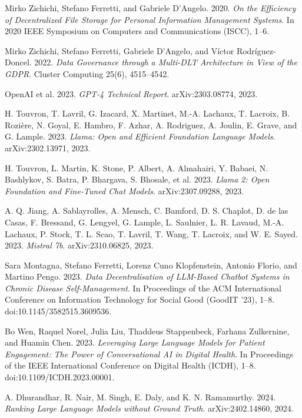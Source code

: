 \begin{thebibliography}{55}
Mirko Zichichi, Stefano Ferretti, and Gabriele D’Angelo. 2020. \emph{On the Efficiency of Decentralized File Storage for Personal Information Management Systems}. In 2020 IEEE Symposium on Computers and Communications (ISCC), 1--6.

Mirko Zichichi, Stefano Ferretti, Gabriele D’Angelo, and Víctor Rodríguez-Doncel. 2022. \emph{Data Governance through a Multi-DLT Architecture in View of the GDPR}. Cluster Computing 25(6), 4515--4542.

OpenAI et al. 2023. \emph{GPT-4 Technical Report}. arXiv:2303.08774, 2023.

H. Touvron, T. Lavril, G. Izacard, X. Martinet, M.-A. Lachaux, T. Lacroix, B. Rozière, N. Goyal, E. Hambro, F. Azhar, A. Rodriguez, A. Joulin, E. Grave, and G. Lample. 2023. \emph{Llama: Open and Efficient Foundation Language Models}. arXiv:2302.13971, 2023.

H. Touvron, L. Martin, K. Stone, P. Albert, A. Almahairi, Y. Babaei, N. Bashlykov, S. Batra, P. Bhargava, S. Bhosale, et al. 2023. \emph{Llama 2: Open Foundation and Fine-Tuned Chat Models}. arXiv:2307.09288, 2023.

A. Q. Jiang, A. Sablayrolles, A. Mensch, C. Bamford, D. S. Chaplot, D. de las Casas, F. Bressand, G. Lengyel, G. Lample, L. Saulnier, L. R. Lavaud, M.-A. Lachaux, P. Stock, T. L. Scao, T. Lavril, T. Wang, T. Lacroix, and W. E. Sayed. 2023. \emph{Mistral 7b}. arXiv:2310.06825, 2023.

Sara Montagna, Stefano Ferretti, Lorenz Cuno Klopfenstein, Antonio Florio, and Martino Pengo. 2023. \emph{Data Decentralisation of LLM-Based Chatbot Systems in Chronic Disease Self-Management}. In Proceedings of the ACM International Conference on Information Technology for Social Good (GoodIT '23), 1--8. doi:10.1145/3582515.3609536.

Bo Wen, Raquel Norel, Julia Liu, Thaddeus Stappenbeck, Farhana Zulkernine, and Huamin Chen. 2023. \emph{Leveraging Large Language Models for Patient Engagement: The Power of Conversational AI in Digital Health}. In Proceedings of the IEEE International Conference on Digital Health (ICDH), 1--8. doi:10.1109/ICDH.2023.00001.

A. Dhurandhar, R. Nair, M. Singh, E. Daly, and K. N. Ramamurthy. 2024. \emph{Ranking Large Language Models without Ground Truth}. arXiv:2402.14860, 2024.


\end{thebibliography}
